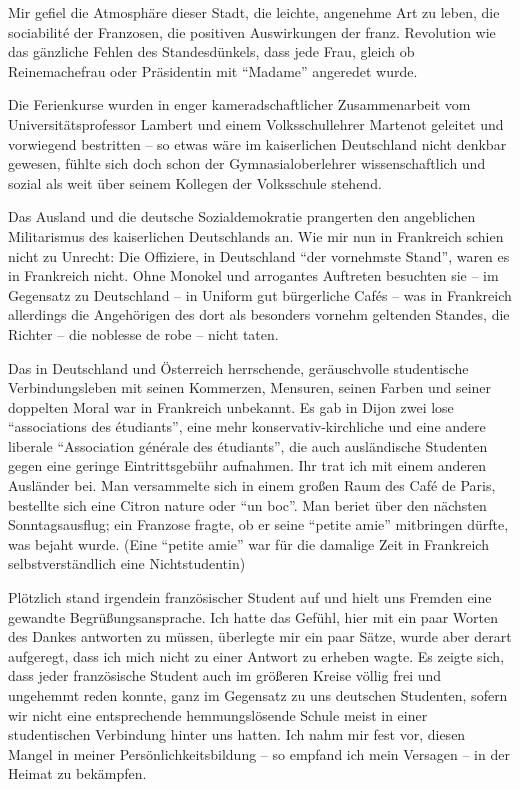 Mir gefiel die Atmosphäre dieser Stadt, die leichte, angenehme Art zu leben, die sociabilité der Franzosen, die positiven Auswirkungen der franz. Revolution wie das gänzliche Fehlen des Standesdünkels, dass jede Frau, gleich ob Reinemachefrau oder Präsidentin mit \enquote{Madame} angeredet wurde.

Die Ferienkurse wurden in enger kameradschaftlicher Zusammenarbeit vom Universitätsprofessor Lambert und einem Volksschullehrer Martenot geleitet und vorwiegend bestritten -- so etwas wäre im kaiserlichen Deutschland nicht denkbar gewesen, fühlte sich doch schon der Gymnasialoberlehrer wissenschaftlich und sozial als weit über seinem Kollegen der Volksschule stehend.

Das Ausland und die deutsche Sozialdemokratie prangerten den angeblichen Militarismus des kaiserlichen Deutschlands an. Wie mir nun in Frankreich schien nicht zu Unrecht: Die Offiziere, in Deutschland \enquote{der vornehmste Stand}, waren es in Frankreich nicht. Ohne Monokel und arrogantes Auftreten besuchten sie -- im Gegensatz zu Deutschland -- in Uniform gut bürgerliche Cafés -- was in Frankreich allerdings die Angehörigen des dort als besonders vornehm geltenden Standes, die Richter -- die noblesse de robe -- nicht taten.

Das in Deutschland und Österreich herrschende, geräuschvolle studentische Verbindungsleben mit seinen Kommerzen, Mensuren, seinen Farben und seiner doppelten Moral war in Frankreich unbekannt. Es gab in Dijon zwei lose \enquote{associations des étudiants}, eine mehr konservativ-kirchliche und eine andere liberale \enquote{Association générale des étudiants}, die auch ausländische Studenten gegen eine geringe Eintrittsgebühr aufnahmen. Ihr trat ich mit einem anderen Ausländer bei. Man versammelte sich in einem großen Raum des Café de Paris, bestellte sich eine Citron nature oder \enquote{un boc}. Man beriet über den nächsten Sonntagsausflug; ein Franzose fragte, ob er seine \enquote{petite amie} mitbringen dürfte, was bejaht wurde. (Eine \enquote{petite amie} war für die damalige Zeit in Frankreich selbstverständlich eine Nichtstudentin)

Plötzlich stand irgendein französischer Student auf und hielt uns Fremden eine gewandte Begrüßungsansprache. Ich hatte das Gefühl, hier mit ein paar Worten des Dankes antworten zu müssen, überlegte mir ein paar Sätze, wurde aber derart aufgeregt, dass ich mich nicht zu einer Antwort zu erheben wagte. Es zeigte sich, dass jeder französische Student auch im größeren Kreise völlig frei und ungehemmt reden konnte, ganz im Gegensatz zu uns deutschen Studenten, sofern wir nicht eine entsprechende hemmungslösende Schule meist in einer studentischen Verbindung hinter uns hatten. Ich nahm mir fest vor, diesen Mangel in meiner Persönlichkeitsbildung -- so empfand ich mein Versagen -- in der Heimat zu bekämpfen.

